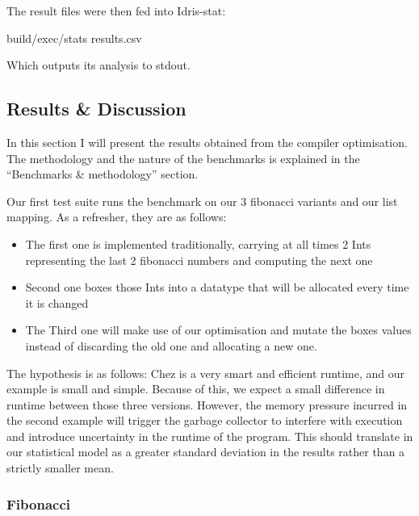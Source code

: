 \documentclass[
]{article}
\newenvironment{Shaded}{}{}
\newcommand{\NormalTok}[1]{#1}
\newcommand{\OperatorTok}[1]{\textcolor[rgb]{0.40,0.40,0.40}{#1}}
\providecommand{\tightlist}{%
  \setlength{\itemsep}{0pt}\setlength{\parskip}{0pt}}
\begin{document}
The result files were then fed into Idris-stat:

\begin{Shaded}
\begin{Highlighting}[]
\NormalTok{build}\OperatorTok{/}\NormalTok{exec}\OperatorTok{/}\NormalTok{stats results}\OperatorTok{.}\NormalTok{csv}
\end{Highlighting}
\end{Shaded}

Which outputs its analysis to stdout.

\hypertarget{results-discussion}{%
\subsection{Results \& Discussion}\label{results-discussion}}

In this section I will present the results obtained from the compiler
optimisation. The methodology and the nature of the benchmarks is
explained in the ``Benchmarks \& methodology'' section.

Our first test suite runs the benchmark on our 3 fibonacci variants and
our list mapping. As a refresher, they are as follows:

\begin{itemize}
\tightlist
\item
  The first one is implemented traditionally, carrying at all times 2
  Ints representing the last 2 fibonacci numbers and computing the next
  one
\item
  Second one boxes those Ints into a datatype that will be allocated
  every time it is changed
\item
  The Third one will make use of our optimisation and mutate the boxes
  values instead of discarding the old one and allocating a new one.
\end{itemize}

The hypothesis is as follows: Chez is a very smart and efficient
runtime, and our example is small and simple. Because of this, we expect
a small difference in runtime between those three versions. However, the
memory pressure incurred in the second example will trigger the garbage
collector to interfere with execution and introduce uncertainty in the
runtime of the program. This should translate in our statistical model
as a greater standard deviation in the results rather than a strictly
smaller mean.

\hypertarget{fibonacci-1}{%
\subsubsection{Fibonacci}\label{fibonacci-1}}
\end{document}

